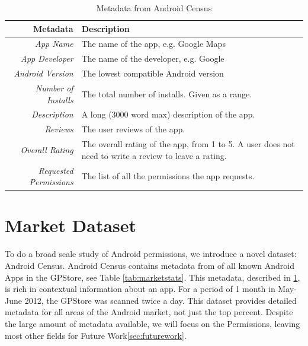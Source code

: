 \begin{table}[t]
\begin{small}
\begin{tabular}{r|l}
Metadata & Description \\
\hline

\textit{App Name} & The name of the app, e.g. Google Maps  \\
\textit{App Developer} & The name of the developer, e.g. Google  \\
\textit{Android Version} & The lowest compatible Android version  \\
\textit{Number of Installs} &  The total number of installs. Given as a range. \\
\textit{Description} &  A long (3000 word max) description of the app. \\
\textit{Reviews} &  The user reviews of the app. \\
\textit{Overall Rating} &  The overall rating of the app, from 1 to 5. A user does not need to write a review to leave a rating. \\
\textit{Requested Permissions} &  The list of all the permissions the app requests. \\

\end{tabular}
\end{small}
\caption{Metadata from Android Census}
\label{tab:marketmetadata}
\end{table}





\section{Market Dataset}
To do a broad scale study of Android permissions, we introduce a novel dataset: Android Census. Android Census contains metadata from  of all known Android Apps in the GPStore, see Table \ref{tab:marketstats}. This metadata, described in \ref{tab:marketmetadata}, is rich in contextual information about an app. For a period of 1 month in May-June 2012, the GPStore was scanned twice a day. This dataset provides detailed metadata for all areas of the Android market, not just the top percent. Despite the large amount of metadata available, we will focus on the Permissions, leaving most other fields for Future Work\ref{sec:futurework}.

